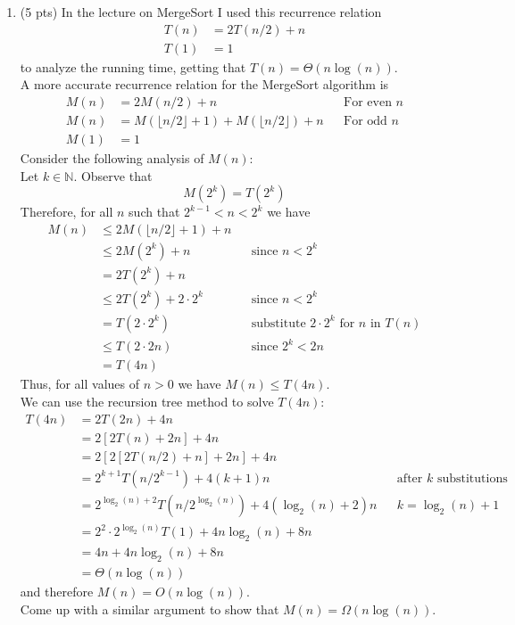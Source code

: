 \documentclass[14pt]{extarticle}
\begin{document}
\begin{enumerate}
\item (5 pts) 
In the lecture on MergeSort I used this recurrence relation
\begin{align*}
T(n) &= 2T(n/2) + n \\
T(1) &= 1
\end{align*}
to analyze the running time, getting that $T(n) = \Theta(n \log(n))$.\\
A more accurate recurrence relation for the MergeSort algorithm is
\begin{align*}
M(n) &= 2M(n/2) + n && \text{For even } n \\
M(n) &= M(\lfloor n/2 \rfloor + 1) + M(\lfloor n/2 \rfloor) + n && \text{For odd } n \\
M(1) &= 1
\end{align*}
Consider the following analysis of $M(n)$:\\
Let $k \in \mathbb{N}$. Observe that 
\[
M(2^k) = T(2^k)
\]
Therefore, for all $n$ such that $2^{k-1} < n < 2^k$ we have
\begin{align*}
M(n) &
\leq 2 M(\lfloor n/2 \rfloor + 1) + n \\
&\leq 2 M(2^k) + n && \text{since } n < 2^k \\
&= 2 T(2^k) + n \\
&\leq 2 T(2^k) + 2 \cdot 2^k && \text{since } n < 2^k \\
&= T(2 \cdot 2^k) && \text{substitute } 2 \cdot 2^k \text{ for } n \text{ in } T(n)\\
&\leq T(2 \cdot 2n) && \text{since } 2^k < 2n \\
&= T(4n)
\end{align*}
Thus, for all values of $n>0$ we have $M(n) \leq T(4n)$.\\
We can use the recursion tree method to solve $T(4n)$:
\begin{align*}
T(4n) 
&= 2T(2n) + 4n \\
&= 2[2T(n) + 2n] + 4n \\
&= 2[2[2T(n/2) + n] + 2n] + 4n \\
&= 2^{k+1} T(n/2^{k-1}) + 4(k+1)n && \text{after $k$ substitutions}\\
&= 2^{\log_2(n) + 2} T(n/2^{\log_2(n)}) + 4(\log_2(n) + 2)n && k = \log_2(n) + 1 \\
&= 2^2 \cdot 2^{\log_2(n)} T(1) + 4n\log_2(n) + 8n \\
&= 4n  + 4n\log_2(n) + 8n \\
&= \Theta(n\log(n))
\end{align*}
and therefore $M(n) = O(n \log(n))$.\\

Come up with a similar argument to show that $M(n) = \Omega(n \log(n))$.





\end{enumerate}
\end{document}
